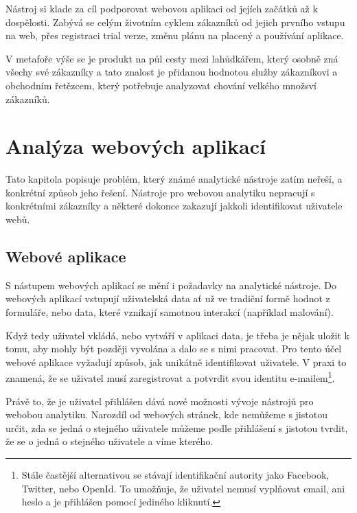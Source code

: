 \documentclass[bc,male,java,dept456]{diploma}						%
\begin{document}
Nástroj si klade za cíl podporovat webovou aplikaci od jejích začátků až k dospělosti. Zabývá se celým životním cyklem zákazníků od jejich prvního vstupu na web, přes registraci trial verze, změnu plánu na placený a používání aplikace.

V metafoře výše se je produkt na půl cesty mezi lahůdkářem, který osobně zná všechy své zákazníky a tato znalost je přidanou hodnotou služby zákazníkovi a obchodním řetězcem, který potřebuje analyzovat chování velkého množsví zákazníků.









\section{Analýza webových aplikací}

Tato kapitola popisuje problém, který známé analytické nástroje zatím neřeší, a konkrétní způsob jeho řešení. Nástroje pro webovou analytiku nepracují s konkrétními zákazníky a některé dokonce zakazují jakkoli identifikovat uživatele webů.



\subsection{Webové aplikace}

S nástupem webových aplikací se mění i požadavky na analytické nástroje. Do webových aplikací vstupují uživatelská data ať už ve tradiční formě hodnot z formuláře, nebo data, které vznikají samotnou interakcí (například  malování). 

Když tedy uživatel vkládá, nebo vytváří v aplikaci data, je třeba je nějak uložit k tomu, aby mohly být později vyvolána a dalo se s nimi pracovat. Pro tento účel webové aplikace vyžadují způsob, jak unikátně identifikovat uživatele. V praxi to znamená, že se uživatel musí zaregistrovat a potvrdit svou identitu e-mailem\footnote{Stále častější alternativou se stávají identifikační autority jako Facebook, Twitter, nebo OpenId. To umožňuje, že uživatel nemusí vyplňovat email, ani heslo a je přihlášen pomocí jediného kliknutí.}.

Právě to, že je uživatel přihlášen dává nové možnosti vývoje nástrojů pro webobou analytiku. Narozdíl od webových stránek, kde nemůžeme s jistotou určit, zda se jedná o stejného uživatele můžeme podle přihlášení s jistotou tvrdit, že se o jedná o stejného uživatele a víme kterého.
\end{document}
